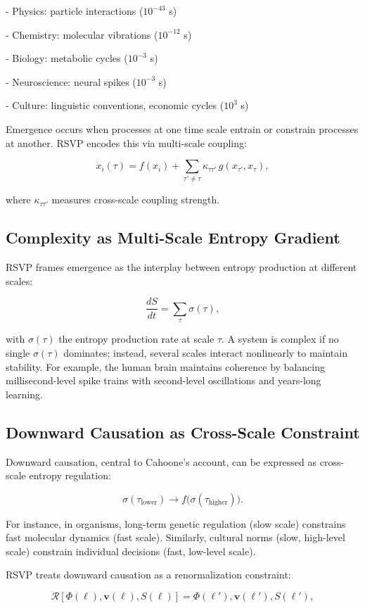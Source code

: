 \documentclass[12pt]{book}
\begin{document}
- Physics: particle interactions (\( 10^{-43} \) s)

- Chemistry: molecular vibrations (\( 10^{-12} \) s)

- Biology: metabolic cycles (\( 10^{-3} \) s)

- Neuroscience: neural spikes (\( 10^{-3} \) s)

- Culture: linguistic conventions, economic cycles (\( 10^{3} \) s)

Emergence occurs when processes at one time scale entrain or constrain processes at another. RSVP encodes this via multi-scale coupling:

\[ \dot{x}_i(\tau) = f(x_i) + \sum_{\tau' \neq \tau} \kappa_{\tau \tau'} \, g(x_{\tau'}, x_\tau), \]

where \( \kappa_{\tau \tau'} \) measures cross-scale coupling strength.

\subsection{Complexity as Multi-Scale Entropy Gradient}
RSVP frames emergence as the interplay between entropy production at different scales:

\[ \frac{dS}{dt} = \sum_{\tau} \sigma(\tau), \]

with \( \sigma(\tau) \) the entropy production rate at scale \( \tau \). A system is complex if no single \( \sigma(\tau) \) dominates; instead, several scales interact nonlinearly to maintain stability. For example, the human brain maintains coherence by balancing millisecond-level spike trains with second-level oscillations and years-long learning.

\subsection{Downward Causation as Cross-Scale Constraint}
Downward causation, central to Cahoone’s account, can be expressed as cross-scale entropy regulation:

\[ \sigma(\tau_{\text{lower}}) \to f\big(\sigma(\tau_{\text{higher}})\big). \]

For instance, in organisms, long-term genetic regulation (slow scale) constrains fast molecular dynamics (fast scale). Similarly, cultural norms (slow, high-level scale) constrain individual decisions (fast, low-level scale).

RSVP treats downward causation as a renormalization constraint:

\[ \mathcal{R}[\Phi(\ell), \mathbf{v}(\ell), S(\ell)] = \Phi(\ell'), \mathbf{v}(\ell'), S(\ell'), \]
\end{document}
